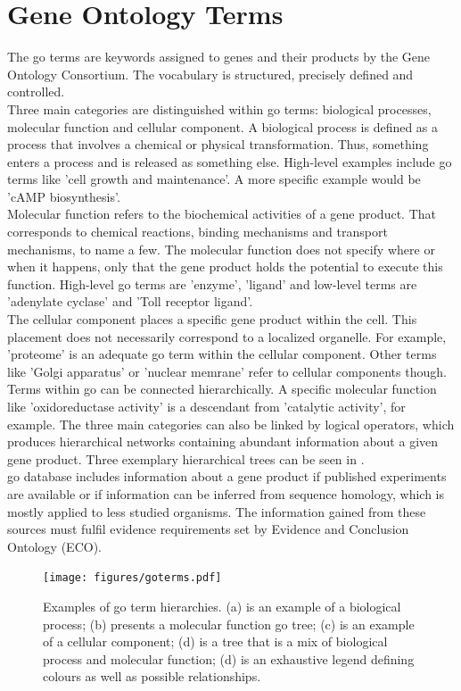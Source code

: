 \section{Gene Ontology Terms}\label{sec:geneontologyBackground}
The \ac{go} terms are keywords assigned to genes and their products by the Gene Ontology Consortium. The vocabulary is structured, precisely defined and controlled.\cite{Ashburner2000}\\
Three main categories are distinguished within \ac{go} terms: biological processes, molecular function and cellular component. A biological process is defined as a process that involves a chemical or physical transformation. Thus, something enters a process and is released as something else. High-level examples include \ac{go} terms like 'cell growth and maintenance'. A more specific example would be 'cAMP biosynthesis'.\cite{Ashburner2000}\\
Molecular function refers to the biochemical activities of a gene product. That corresponds to chemical reactions, binding mechanisms and transport mechanisms, to name a few. The molecular function does not specify where or when it happens, only that the gene product holds the potential to execute this function. High-level \ac{go} terms are 'enzyme', 'ligand' and low-level terms are 'adenylate cyclase' and 'Toll receptor ligand'.\cite{Ashburner2000}\\
The cellular component places a specific gene product within the cell. This placement does not necessarily correspond to a localized organelle. For example, 'proteome' is an adequate \ac{go} term within the cellular component. Other terms like 'Golgi apparatus' or 'nuclear memrane' refer to cellular components though.\cite{Ashburner2000}
Terms within \ac{go} can be connected hierarchically. A specific molecular function like 'oxidoreductase activity' is a descendant from 'catalytic activity', for example. The three main categories can also be linked by logical operators, which produces hierarchical networks containing abundant information about a given gene product.\cite{Ashburner2000} Three exemplary hierarchical trees can be seen in .\\
\ac{go} database includes information about a gene product if published experiments are available or if information can be inferred from sequence homology, which is mostly applied to less studied organisms. The information gained from these sources must fulfil evidence requirements set by Evidence and Conclusion Ontology (ECO).\cite{Ashburner2000,Carbon2020}
\begin{figure}[H]
	\centering
	\texttt{[image: figures/goterms.pdf]}
	\caption[Examples of \ac{go} Term Hierarchies]{Examples of \ac{go} term hierarchies. (a) is an example of a biological process; (b) presents a molecular function \ac{go} tree; (c) is an example of a cellular component; (d) is a tree that is a mix of biological process and molecular function; (d) is an exhaustive legend defining colours as well as possible relationships.}
	\label{fig:gotermtree}
\end{figure}